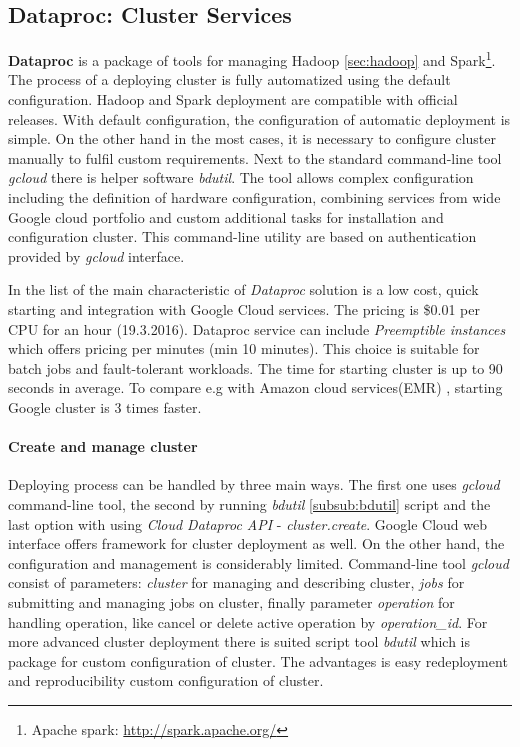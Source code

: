 \documentclass[a4paper,12pt,oneside]{report}
\begin{document}
	
	
	\subsection{Dataproc: Cluster Services}
	\label{subsub:dataproc}
	\textbf{Dataproc} is a package of tools for managing Hadoop \ref{sec:hadoop} 
	and Spark\footnote{Apache spark: \url{http://spark.apache.org/}}.
	The process of a deploying cluster is fully automatized using the default 
	configuration. Hadoop and Spark deployment are compatible with official
	releases. With default configuration, the configuration of automatic deployment is simple. 
	On the other hand in the most cases, it is 
	necessary to configure cluster manually to fulfil custom requirements. 
	Next to the standard command-line tool \textit{gcloud} there is 
	helper software \emph{bdutil}.  The tool  allows complex 
	configuration including the  
	definition of hardware configuration, combining services from wide Google cloud 
	portfolio and custom additional tasks for installation and configuration
	cluster. 
	This command-line utility are based on authentication provided by \textit{gcloud}
	interface.
	
	In the list of the main characteristic of \textit{Dataproc} solution is a 
	low cost, quick starting and integration with Google Cloud services. 
	The pricing is  \$0.01 per CPU for an hour (19.3.2016). Dataproc service can 
	include \textit{Preemptible instances} which offers pricing 
	per minutes (min 10 minutes). This choice is suitable for batch jobs and 
	fault-tolerant workloads. The time for starting cluster is up to 
	90 seconds in average. To compare e.g with Amazon cloud
	services(EMR) \cite{amazon_emr}, starting Google cluster is 3 times faster.
	
	\paragraph{Create and manage cluster} Deploying process can be handled by three
	main ways. The first one uses \textit{gcloud} command-line tool, the second by running
	\textit{bdutil} \ref{subsub:bdutil} script and the last option with using 
	\textit{Cloud Dataproc API} - \textit{cluster.create}. Google Cloud web
	interface offers framework for cluster deployment as well. On the other hand,
	the configuration and management is considerably limited. Command-line tool
	\textit{gcloud} consist of parameters: \textit{cluster} for managing and describing
	cluster, \textit{jobs} for submitting 	and managing jobs on cluster, finally parameter
	\textit{operation} for handling operation, like cancel or delete active 
	operation by \emph{operation\_id}. For more advanced cluster deployment there is	
	suited script tool \textit{bdutil} which is 
	package for custom configuration of cluster. The advantages is easy
	redeployment and	reproducibility custom	configuration of cluster. 
	
\end{document}
